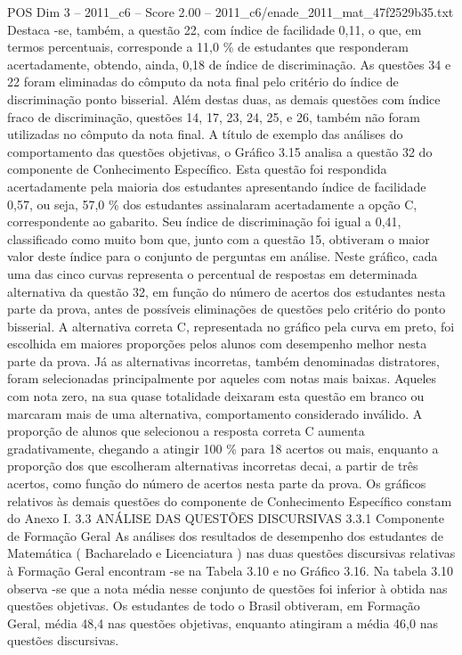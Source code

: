 \begin{textsample}{POS Dim 3 – 2011\_c6 – Score 2.00 – 2011\_c6/enade\_2011\_mat\_47f2529b35.txt}
Destaca -se, também, a questão 22, com índice de facilidade 0,11, o que, em termos percentuais, corresponde a 11,0 \% de estudantes que responderam acertadamente, obtendo, ainda, 0,18 de índice de discriminação.
As questões 34 e 22 foram eliminadas do cômputo da nota final pelo critério do índice de discriminação ponto bisserial.
Além destas duas, as demais questões com índice fraco de discriminação, questões 14, 17, 23, 24, 25, e 26, também não foram utilizadas no cômputo da nota final.
A título de exemplo das análises do comportamento das questões objetivas, o Gráfico 3.15 analisa a questão 32 do componente de Conhecimento Específico.
Esta questão foi respondida acertadamente pela maioria dos estudantes apresentando índice de facilidade 0,57, ou seja, 57,0 \% dos estudantes assinalaram acertadamente a opção C, correspondente ao gabarito.
Seu índice de discriminação foi igual a 0,41, classificado como muito bom que, junto com a questão 15, obtiveram o maior valor deste índice para o conjunto de perguntas em análise.
Neste gráfico, cada uma das cinco curvas representa o percentual de respostas em determinada alternativa da questão 32, em função do número de acertos dos estudantes nesta parte da prova, antes de possíveis eliminações de questões pelo critério do ponto bisserial.
A alternativa correta C, representada no gráfico pela curva em preto, foi escolhida em maiores proporções pelos alunos com desempenho melhor nesta parte da prova.
Já as alternativas incorretas, também denominadas distratores, foram selecionadas principalmente por aqueles com notas mais baixas.
Aqueles com nota zero, na sua quase totalidade deixaram esta questão em branco ou marcaram mais de uma alternativa, comportamento considerado inválido.
A proporção de alunos que selecionou a resposta correta C aumenta gradativamente, chegando a atingir 100 \% para 18 acertos ou mais, enquanto a proporção dos que escolheram alternativas incorretas decai, a partir de três acertos, como função do número de acertos nesta parte da prova.
Os gráficos relativos às demais questões do componente de Conhecimento Específico constam do Anexo I. 3.3 ANÁLISE DAS QUESTÕES DISCURSIVAS 3.3.1 Componente de Formação Geral As análises dos resultados de desempenho dos estudantes de Matemática ( Bacharelado e Licenciatura ) nas duas questões discursivas relativas à Formação Geral encontram -se na Tabela 3.10 e no Gráfico 3.16.
Na tabela 3.10 observa -se que a nota média nesse conjunto de questões foi inferior à obtida nas questões objetivas.
Os estudantes de todo o Brasil obtiveram, em Formação Geral, média 48,4 nas questões objetivas, enquanto atingiram a média 46,0 nas questões discursivas.

\end{textsample}
